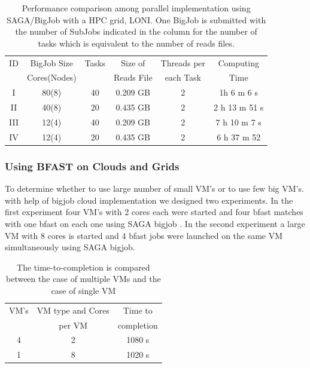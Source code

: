 \documentclass{acm_proc_article-sp}
\begin{document}
 \begin{table}
 \begin{tabular}{|ccccc|c |} 
 \hline 
ID & BigJob Size  &  Tasks & Size of  & Threads per  &  Computing  \\
   & Cores(Nodes) &  & Reads File & each Task &  Time\\\hline
I   & 80(8) &  40 & 0.209 GB & 2 & 1h 6 m 6 s \\
II  & 40(8)  &  20 & 0.435 GB & 2 & 2 h 13 m 51 s\\
III & 12(4)  & 40  & 0.209 GB & 2 & 7 h 10 m 7 s \\
IV & 12(4)  & 20 & 0.435 GB & 2 &  6 h 37 m 52  \\
\hline
\end{tabular}
\caption{Performance comparison among parallel implementation using SAGA/BigJob with a HPC grid, LONI. One BigJob is submitted with the number of SubJobs indicated in the column for the number of tasks which is equivalent to the number of reads files.}
  \label{table:bigjob-loni} 
\end{table}
 


\subsubsection{Using BFAST on Clouds and Grids}

To determine whether to use large number of small VM's or to use few big VM's. with help of bigjob cloud implementation we designed two experiments. In the first experiment four VM's with 2 cores each were started and four bfast matches with one bfast on each one using SAGA bigjob . In the second experiment a large VM with 8 cores is started and 4 bfast jobs were launched on the same VM simultaneously using SAGA bigjob.

 \begin{table}
 \begin{tabular}{|c|c|c|} 
 \hline 
VM's & VM type and Cores  & Time to  \\ 
&per VM& completion\\ 
\hline
4 &  2 & 1080 s \\
1 & 8 & 1020 s \\
 \hline 
 \end{tabular}
 \label{table:cloud VM's} 
 \caption{The time-to-completion is compared between the case of multiple VMs and the case of single VM}
\end{table}
\end{document}
